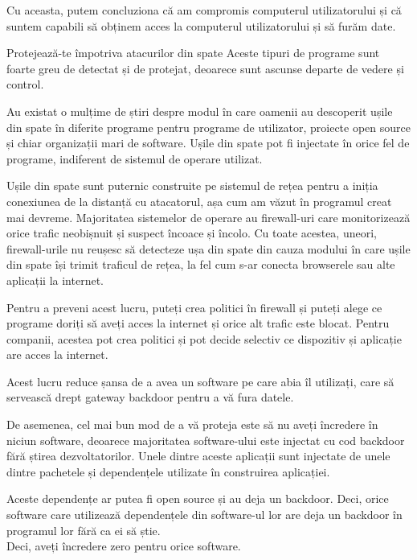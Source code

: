 \documentclass[oneside,20pt]{article}          %
\begin{document}
 

Cu aceasta, putem concluziona că am compromis computerul utilizatorului și că suntem capabili să obținem acces la computerul utilizatorului și să furăm date.

 

Protejează-te împotriva atacurilor din spate
Aceste tipuri de programe sunt foarte greu de detectat și de protejat, deoarece sunt ascunse departe de vedere și control.

 

Au existat o mulțime de știri despre modul în care oamenii au descoperit ușile din spate în diferite programe pentru programe de utilizator, proiecte open source și chiar organizații mari de software. Ușile din spate pot fi injectate în orice fel de programe, indiferent de sistemul de operare utilizat.

 

Ușile din spate sunt puternic construite pe sistemul de rețea pentru a iniția conexiunea de la distanță cu atacatorul, așa cum am văzut în programul creat mai devreme. Majoritatea sistemelor de operare au firewall-uri care monitorizează orice trafic neobișnuit și suspect încoace și încolo. Cu toate acestea, uneori, firewall-urile nu reușesc să detecteze ușa din spate din cauza modului în care ușile din spate își trimit traficul de rețea, la fel cum s-ar conecta browserele sau alte aplicații la internet.

 

Pentru a preveni acest lucru, puteți crea politici în firewall și puteți alege ce programe doriți să aveți acces la internet și orice alt trafic este blocat. Pentru companii, acestea pot crea politici și pot decide selectiv ce dispozitiv și aplicație are acces la internet.

 

Acest lucru reduce șansa de a avea un software pe care abia îl utilizați, care să servească drept gateway backdoor pentru a vă fura datele.

 

De asemenea, cel mai bun mod de a vă proteja este să nu aveți încredere în niciun software, deoarece majoritatea software-ului este injectat cu cod backdoor fără știrea dezvoltatorilor. Unele dintre aceste aplicații sunt injectate de unele dintre pachetele și dependențele utilizate în construirea aplicației.

 

Aceste dependențe ar putea fi open source și au deja un backdoor. Deci, orice software care utilizează dependențele din software-ul lor are deja un backdoor în programul lor fără ca ei să știe.\\
Deci, aveți încredere zero pentru orice software.\\
\end{document}
